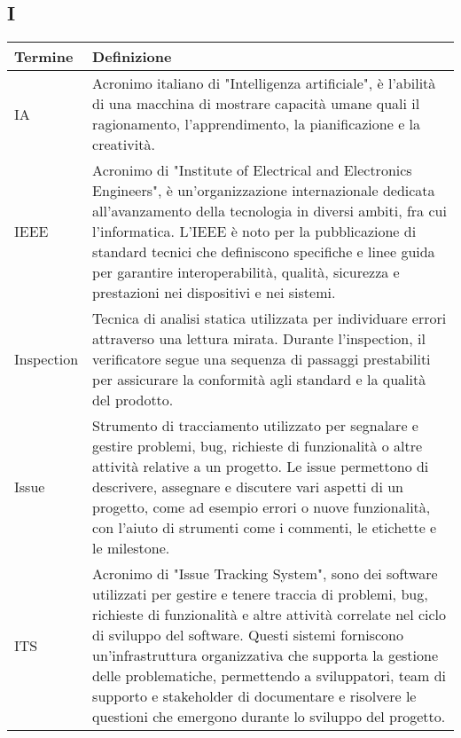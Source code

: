 \documentclass[10pt]{article}
\begin{document}
\subsection{I} %
\begin{longtable}{|>{\centering\arraybackslash}m{2.5cm}|>{\arraybackslash}m{12.5cm}|}
\hline
\rowcolor[gray]{0.8}
\textbf{Termine} & \textbf{Definizione}\\
\endhead
\hline
IA & Acronimo italiano di "Intelligenza artificiale", è l'abilità di una macchina di mostrare capacità umane quali il ragionamento, l'apprendimento, la pianificazione e la creatività.\\
\hline
IEEE & Acronimo di "Institute of Electrical and Electronics Engineers", è un'organizzazione internazionale dedicata all'avanzamento della tecnologia in diversi ambiti, fra cui l'informatica. L'IEEE è noto per la pubblicazione di standard tecnici che definiscono specifiche e linee guida per garantire interoperabilità, qualità, sicurezza e prestazioni nei dispositivi e nei sistemi.\\
\hline
Inspection & Tecnica di analisi statica utilizzata per individuare errori attraverso una lettura mirata. Durante l'inspection, il verificatore segue una sequenza di passaggi prestabiliti per assicurare la conformità agli standard e la qualità del prodotto.\\
\hline
Issue & Strumento di tracciamento utilizzato per segnalare e gestire problemi, bug, richieste di funzionalità o altre attività relative a un progetto. Le issue permettono di descrivere, assegnare e discutere vari aspetti di un progetto, come ad esempio errori o nuove funzionalità, con l'aiuto di strumenti come i commenti, le etichette e le milestone.\\
\hline
ITS & Acronimo di "Issue Tracking System", sono dei software utilizzati per gestire e tenere traccia di problemi, bug, richieste di funzionalità e altre attività correlate nel ciclo di sviluppo del software. Questi sistemi forniscono un'infrastruttura organizzativa che supporta la gestione delle problematiche, permettendo a sviluppatori, team di supporto e stakeholder di documentare e risolvere le questioni che emergono durante lo sviluppo del progetto.\\
\hline
\end{longtable}

\end{document}

